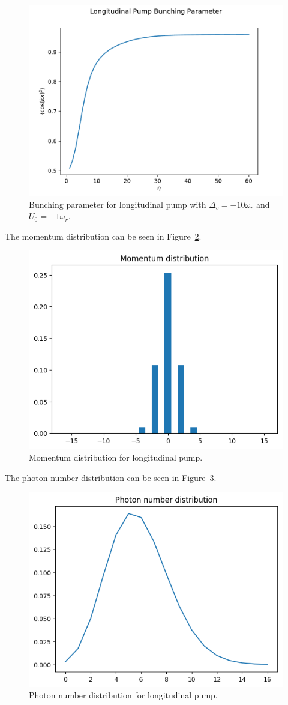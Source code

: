 \begin{figure}[ht]
  \centering
  \includegraphics[width=.7\linewidth]{images/long_pmp_bunch.pdf}
  \caption{Bunching parameter for longitudinal pump with $\Delta_c = -10 \omega_r$ and $U_0 = -1 \omega_r$.}
  \label{long_pmp_bunch}
\end{figure}
\FloatBarrier

\noindent The momentum distribution can be seen in Figure~\ref{fig:long_momentum}.

\begin{figure}[ht]
  \centering
  \includegraphics[width=.7\linewidth]{images/long_momentum.png}
  \caption{Momentum distribution for longitudinal pump.}
  \label{fig:long_momentum}
\end{figure}
\FloatBarrier

\noindent The photon number distribution can be seen in Figure~\ref{fig:long_photon_dist}.

\begin{figure}[ht]
  \centering
  \includegraphics[width=.7\linewidth]{images/long_photon_dist.png}
  \caption{Photon number distribution for longitudinal pump.}
  \label{fig:long_photon_dist}
\end{figure}
\FloatBarrier

